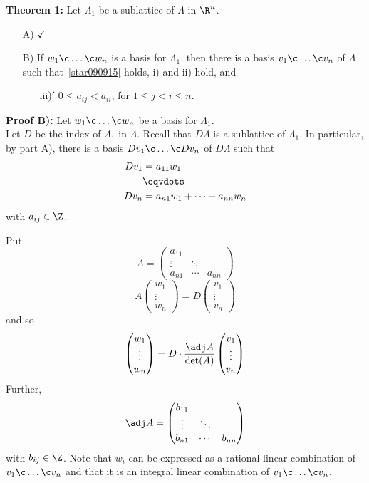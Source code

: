 \textbf{Theorem 1:} Let $\Lambda_1$ be a sublattice of $\Lambda$ in $\R^n$.
\begin{enumerate}
\item[A)] $\checkmark$
\item[B)] If $w_1\c \dotsc\c w_n$ is a basis for $\Lambda_1$, then there is a basis $v_1\c \dotsc\c v_n$ of $\Lambda$ such that~\eqref{star090915} holds, i) and ii) hold, and
\begin{enumerate}
\item[iii)$'$] $0\leq a_{ij} < a_{ii}$, for $1\leq j<i\leq n$.
\end{enumerate}
\end{enumerate}
\textbf{Proof B):} Let $w_1\c \dotsc\c w_n$ be a basis for $\Lambda_1$. \\ Let $D$ be the index of $\Lambda_1$ in $\Lambda$.  Recall that $D\Lambda$ is a sublattice of $\Lambda_1$.  In particular, by part A), there is a basis $Dv_1\c \dotsc\c Dv_n$ of $D\Lambda$ such that
\begin{align*}
Dv_1 &= a_{11}w_1 \\
&\eqvdots \\
Dv_n &= a_{n1}w_1 + \dotsb + a_{nn}w_n
\end{align*}
with $a_{ij}\in\Z$.

Put
\[ A = \begin{pmatrix}
a_{11} & & \\
\vdots & \ddots & \\
a_{n1} & \cdots & a_{nn}
\end{pmatrix} \]
\[ A \begin{pmatrix}
w_1 \\
\vdots \\
w_n
\end{pmatrix} = 
D \begin{pmatrix}
v_1 \\
\vdots \\
v_n
\end{pmatrix} \]
and so
\[ \begin{pmatrix}
w_1 \\
\vdots \\
w_n
\end{pmatrix} =
D\cdot\frac{\adj A}{\det(A)} \begin{pmatrix}
v_1 \\
\vdots \\
v_n
\end{pmatrix} \]
Further,%
\[ \adj A = \begin{pmatrix}
b_{11} & & \\
\vdots & \ddots & \\
b_{n1} & \cdots & b_{nn}
\end{pmatrix} \]
with $b_{ij}\in\Z$.  Note that $w_i$ can be expressed as a rational linear combination of $v_1\c \dotsc\c v_n$ and that it is an integral linear combination of $v_1\c \dotsc\c v_n$.%

